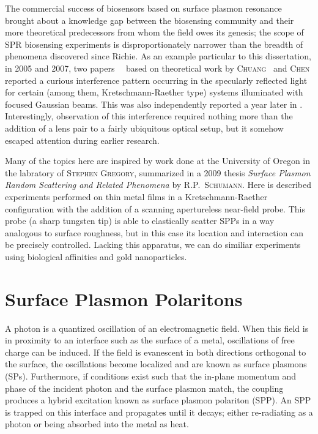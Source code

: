 \documentclass[a4paper,titlepage,onecolumn]{report}
\makeatletter
\newcommand{\name}[1]{\textsc{#1}}
\renewcommand{\todo}[2][]{\tikzexternaldisable\@todo[#1]{#2}\tikzexternalenable}
\makeatother
\begin{document}
The commercial success of biosensors based on surface plasmon resonance
brought about a knowledge gap between the biosensing community and their
more theoretical predecessors from whom the field owes its genesis; the
scope of SPR biosensing experiments is disproportionately narrower than the
breadth of phenomena discovered since Richie.  As an example particular to
this dissertation, in 2005 and 2007, two
papers~\cite{andaloro2005optical}~\cite{simon2007observation} based on
theoretical work by \name{Chuang}~\cite{chuang1986lateral} and
\name{Chen} \cite{chen1976excitation} reported a curious interference
pattern occurring in the specularly reflected light for certain (among
them, Kretschmann-Raether type) systems illuminated with focused Gaussian
beams.  This was also independently reported a year later in
\cite{schumann2008near}.  Interestingly, observation of this interference
required nothing more than the addition of a lens pair to a fairly
ubiquitous optical setup, but it somehow escaped attention during earlier
research.  

Many of the topics here are inspired by work done at the University of
Oregon in the labratory of \name{Stephen Gregory}, summarized in
a 2009 thesis \textit{Surface Plasmon Random Scattering and Related
Phenomena} \cite{schumann2009surface} by \name{R\@.P.\@~Schumann}.
Here is described experiments performed on thin metal films in a
Kretschmann-Raether configuration with the addition of a scanning
apertureless near-field probe.  This probe (a sharp tungsten tip) is able
to elastically scatter SPPs in a way analogous to surface roughness, but in
this case its location and interaction can be precisely controlled.
Lacking this apparatus, we can do similiar experiments using biological
affinities and gold nanoparticles.
\todo{Improve this last sentence.}

\section{Surface Plasmon Polaritons}
A photon is a quantized oscillation of an electromagnetic field.  When this
field is in proximity to an interface such as the surface of a metal,
oscillations of free charge can be induced.  If the field is evanescent in
both directions orthogonal to the surface, the oscillations become
localized and are known as surface plasmons (SPs).  Furthermore, if
conditions exist such that the in-plane momentum and phase of the incident
photon and the surface plasmon match, the coupling produces a hybrid
excitation known as surface plasmon polariton (SPP).  An SPP is trapped on
this interface and propagates until it decays; either re-radiating as a
photon or being absorbed into the metal as heat.
\end{document}
